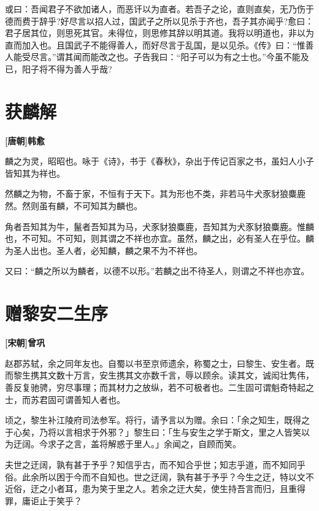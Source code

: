 \documentclass[UTF8,titlepage,oneside]{ctexbook}
\begin{document}
或曰：吾闻君子不欲加诸人，而恶讦以为直者。若吾子之论，直则直矣，无乃伤于德而费于辞乎?好尽言以招人过，国武子之所以见杀于齐也，吾子其亦闻乎?愈曰：君子居其位，则思死其官。未得位，则思修其辞以明其道。我将以明道也，非以为直而加入也。且国武子不能得善人，而好尽言于乱国，是以见杀。《传》曰：“惟善人能受尽言。”谓其闻而能改之也。子告我曰：“阳子可以为有之士也。”今虽不能及已，阳子将不得为善人乎哉?


\chapter*{获麟解}
\begin{center}
	\textbf{[唐朝]韩愈}
\end{center}

麟之为灵，昭昭也。咏于《诗》，书于《春秋》，杂出于传记百家之书，虽妇人小子皆知其为祥也。

然麟之为物，不畜于家，不恒有于天下。其为形也不类，非若马牛犬豕豺狼麋鹿然。然则虽有麟，不可知其为麟也。

角者吾知其为牛，鬣者吾知其为马，犬豕豺狼麋鹿，吾知其为犬豕豺狼麋鹿。惟麟也，不可知。不可知，则其谓之不祥也亦宜。虽然，麟之出，必有圣人在乎位。麟为圣人出也。圣人者，必知麟，麟之果不为不祥也。

又曰：“麟之所以为麟者，以德不以形。”若麟之出不待圣人，则谓之不祥也亦宜。


\chapter*{赠黎安二生序}
\begin{center}
	\textbf{[宋朝]曾巩}
\end{center}


赵郡苏轼，余之同年友也。自蜀以书至京师遗余，称蜀之士，曰黎生、安生者。既而黎生携其文数十万言，安生携其文亦数千言，辱以顾余。读其文，诚闳壮隽伟，善反复驰骋，穷尽事理；而其材力之放纵，若不可极者也。二生固可谓魁奇特起之士，而苏君固可谓善知人者也。


顷之，黎生补江陵府司法参军。将行，请予言以为赠。余曰：「余之知生，既得之于心矣，乃将以言相求于外邪？」黎生曰：「生与安生之学于斯文，里之人皆笑以为迂阔。今求子之言，盖将解惑于里人。」余闻之，自顾而笑。


夫世之迂阔，孰有甚于予乎？知信乎古，而不知合乎世；知志乎道，而不知同乎俗。此余所以困于今而不自知也。世之迂阔，孰有甚于予乎？今生之迂，特以文不近俗，迂之小者耳，患为笑于里之人。若余之迂大矣，使生持吾言而归，且重得罪，庸讵止于笑乎？
\end{document}
